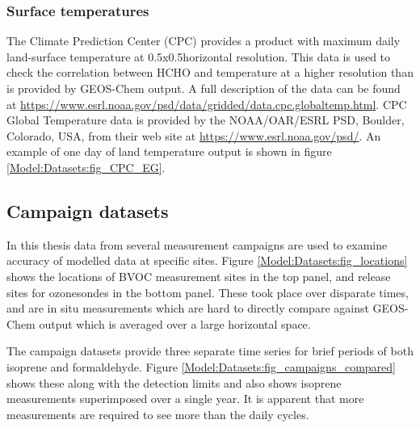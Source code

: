     \subsubsection{Surface temperatures}
      The Climate Prediction Center (CPC) provides a product with maximum daily land-surface temperature at 0.5x0.5\degr  horizontal resolution. 
      This data is used to check the correlation between HCHO and temperature at a higher resolution than is provided by GEOS-Chem output.
      A full description of the data can be found at \url{https://www.esrl.noaa.gov/psd/data/gridded/data.cpc.globaltemp.html}.
      CPC Global Temperature data is provided by the NOAA/OAR/ESRL PSD, Boulder, Colorado, USA, from their web site at \url{https://www.esrl.noaa.gov/psd/}.
      An example of one day of land temperature output is shown in figure \ref{Model:Datasets:fig_CPC_EG}.
      
  
  \subsection{Campaign datasets}
  
    In this thesis data from several measurement campaigns are used to examine accuracy of modelled data at specific sites.
    Figure \ref{Model:Datasets:fig_locations} shows the locations of BVOC measurement sites in the top panel, and release sites for ozonesondes in the bottom panel.
    These took place over disparate times, and are in situ measurements which are hard to directly compare against GEOS-Chem output which is averaged over a large horizontal space.
    
    
    The campaign datasets provide three separate time series for brief periods of both isoprene and formaldehyde.
    Figure \ref{Model:Datasets:fig_campaigns_compared} shows these along with the detection limits and also shows isoprene measurements superimposed over a single year.
    It is apparent that more measurements are required to see more than the daily cycles.
    
    
    

